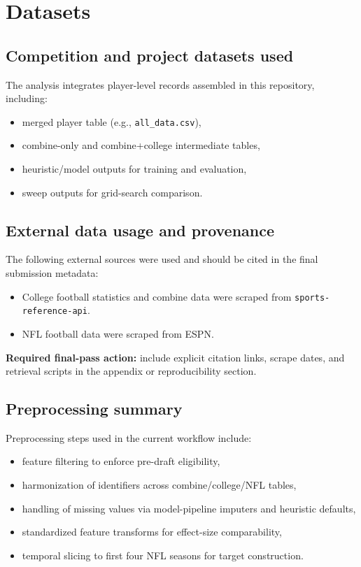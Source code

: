 \documentclass[10pt]{article}
\begin{document}
\section{Datasets}
\subsection{Competition and project datasets used}
The analysis integrates player-level records assembled in this repository, including:
\begin{itemize}
  \item merged player table (e.g., \texttt{all\_data.csv}),
  \item combine-only and combine+college intermediate tables,
  \item heuristic/model outputs for training and evaluation,
  \item sweep outputs for grid-search comparison.
\end{itemize}

\subsection{External data usage and provenance}
The following external sources were used and should be cited in the final submission metadata:
\begin{itemize}
  \item College football statistics and combine data were scraped from \texttt{sports-reference-api}.
  \item NFL football data were scraped from ESPN.
\end{itemize}

\textbf{Required final-pass action:} include explicit citation links, scrape dates, and retrieval scripts in the appendix or reproducibility section.

\subsection{Preprocessing summary}
Preprocessing steps used in the current workflow include:
\begin{itemize}
  \item feature filtering to enforce pre-draft eligibility,
  \item harmonization of identifiers across combine/college/NFL tables,
  \item handling of missing values via model-pipeline imputers and heuristic defaults,
  \item standardized feature transforms for effect-size comparability,
  \item temporal slicing to first four NFL seasons for target construction.
\end{itemize}
\end{document}
